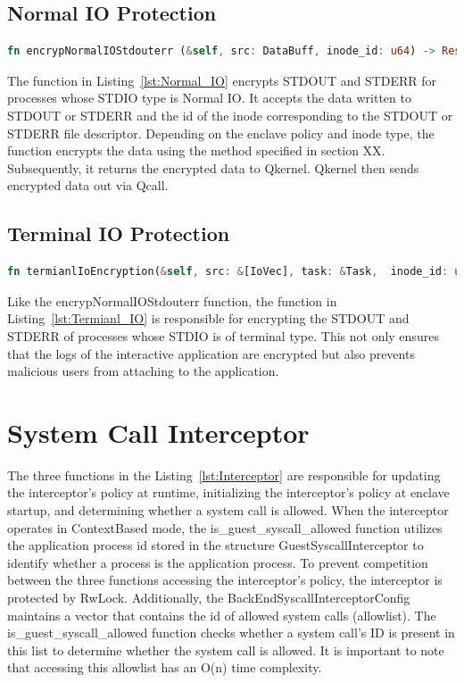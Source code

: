 \subsection{Normal IO Protection}
\begin{lstlisting}[language=rust, caption= API of normal IO shield, label={lst:Normal_IO}]
fn encrypNormalIOStdouterr (&self, src: DataBuff, inode_id: u64) -> Result<DataBuff>
\end{lstlisting}
The function in Listing~\ref*{lst:Normal_IO} encrypts STDOUT and STDERR for processes whose STDIO type is Normal IO. It accepts the data written to STDOUT or STDERR and the id of the inode corresponding to the STDOUT or STDERR file descriptor. Depending on the enclave policy and inode type, the 
function encrypts the data using the method specified in section XX. Subsequently, it returns the encrypted data to Qkernel. Qkernel then sends encrypted data out via Qcall.


\subsection{Terminal IO Protection}
\begin{lstlisting}[language=rust, caption= API of system call interceptor, label={lst:Termianl_IO}]
fn termianlIoEncryption(&self, src: &[IoVec], task: &Task,  inode_id: u64) -> Result<(Vec::<IoVec>)
\end{lstlisting}
Like the encrypNormalIOStdouterr function, the function in Listing~\ref*{lst:Termianl_IO} is responsible for encrypting the STDOUT and STDERR of processes whose STDIO is of terminal type. This not only ensures that the logs of the interactive application are encrypted but also prevents malicious 
users from attaching to the application.

\section{System Call Interceptor}
The three functions in the Listing~\ref{lst:Interceptor} are responsible for updating the interceptor’s policy at runtime, initializing the interceptor’s policy at enclave startup, and determining whether a system call is allowed. When the interceptor operates in ContextBased mode, 
the is\_guest\_syscall\_allowed function utilizes the application process id stored in the structure GuestSyscallInterceptor to identify whether a process is the application process. To prevent competition between the three functions accessing the interceptor's policy, the interceptor is 
protected by RwLock. Additionally, the BackEndSyscallInterceptorConfig maintains a vector that contains the id of allowed system calls (allowlist). The is\_guest\_syscall\_allowed function checks whether a system call's ID is present in this list to determine whether the system call is allowed. 
It is important to note that accessing this allowlist has an O(n) time complexity.

